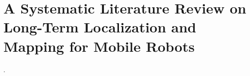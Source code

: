 \chapter{A Systematic Literature Review on Long-Term Localization and Mapping for Mobile Robots}\label{appx:slr}
\begin{description}[leftmargin=1cm,style=nextline,font=\normalfont]
\item[\cite{sousa:jfr:2023}] .
\end{description}

\cleardoublepage


